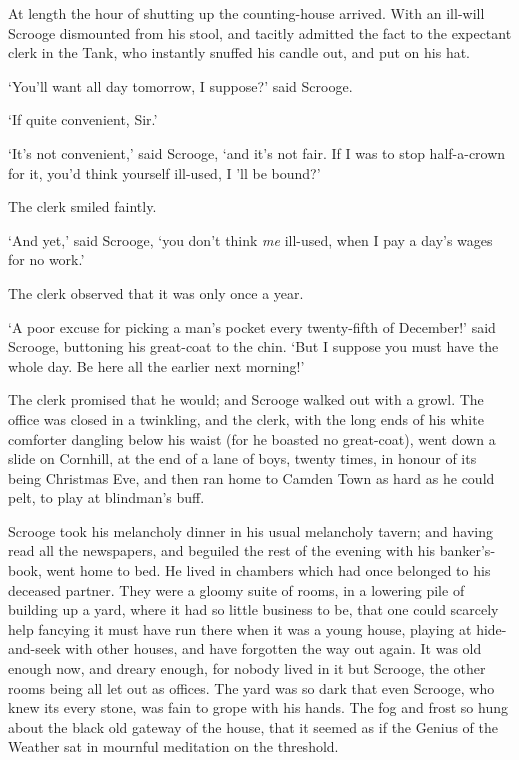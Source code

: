 \documentclass[11pt,twoside]{article}\makeatletter
\begin{document}
At length the hour of shutting up the counting-house arrived.  With an ill-will Scrooge dismounted from his stool, and tacitly admitted the fact to the expectant clerk in the Tank, who instantly snuffed his candle out, and put on his hat.  \par
‘You'll want all day tomorrow, I suppose?’ said Scrooge.  \par
‘If quite convenient, Sir.’\par
‘It's not convenient,’ said Scrooge, ‘and it's not fair. If I was to stop half-a-crown for it, you'd think yourself ill-used, I 'll be bound?’\par
The clerk smiled faintly.  \par
‘And yet,’ said Scrooge, ‘you don't think \textit{me} ill-used, when I pay a day's wages for no work.’\par
The clerk observed that it was only once a year.  \par
‘A poor excuse for picking a man's pocket every twenty-fifth of December!’ said Scrooge, buttoning his great-coat to the chin.  ‘But I suppose you must have the whole day. Be here all the earlier next morning!’\par
The clerk promised that he would; and Scrooge walked out with a growl.  The office was closed in a twinkling, and the clerk, with the long ends of his white comforter dangling below his waist (for he boasted no great-coat), went down a slide on Cornhill, at the end of a lane of boys, twenty times, in honour of its being Christmas Eve, and then ran home to Camden Town as hard as he could pelt, to play at blindman's buff.  \par
Scrooge took his melancholy dinner in his usual melancholy tavern; and having read all the newspapers, and beguiled the rest of the evening with his banker's-book, went home to bed.  He lived in chambers which had once belonged to his deceased partner.  They were a gloomy suite of rooms, in a lowering pile of building up a yard, where it had so little business to be, that one could scarcely help fancying it must have run there when it was a young house, playing at hide-and-seek with other houses, and have forgotten the way out again. It was old enough now, and dreary enough, for nobody lived in it but Scrooge, the other rooms being all let out as offices. The yard was so dark that even Scrooge, who knew its every stone, was fain to grope with his hands.  The fog and frost so hung about the black old gateway of the house, that it seemed as if the Genius of the Weather sat in mournful meditation on the threshold.  \par
\end{document}
